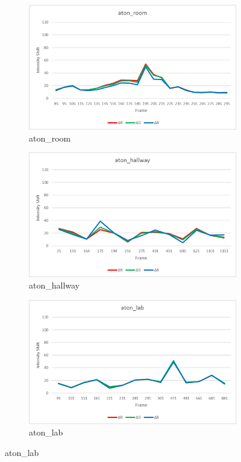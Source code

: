 \begin{figure}
  \centering
  \begin{subfigure}{.49\linewidth}
  \includegraphics[width=1\linewidth]{figures/rgshift_room.jpg}
  \caption{aton\_room}
\end{subfigure}
\hfill
\begin{subfigure}{.49\linewidth}
  \includegraphics[width=1\linewidth]{figures/rgshift_hallway.jpg}
  \caption{aton\_hallway}
\end{subfigure}
\hfill
\begin{subfigure}{.7\linewidth}
  \includegraphics[width=1\linewidth]{figures/rgshift_lab.jpg}
  \caption{aton\_lab}
\end{subfigure}


\end{figure}
